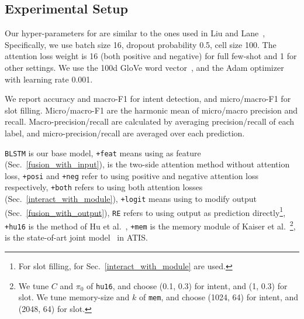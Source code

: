 \subsection{Experimental Setup}
Our hyper-parameters for \BLSTM are similar to the ones used in Liu and Lane~,
Specifically, we use batch size 16, dropout probability 0.5, \BLSTM cell size 100.
The attention loss weight is 16 (both positive and negative) for full few-shot and 1 for other settings.
We use the 100d GloVe word vector~\cite{pennington2014glove}, and the Adam optimizer~\cite{kingma2014adam} with learning rate 0.001.

We report accuracy and macro-F1 for intent detection, and micro/macro-F1 for slot filling.
Micro/macro-F1 are the harmonic mean of micro/macro precision and recall.
Macro-precision/recall are calculated by averaging precision/recall of each label, and micro-precision/recall are averaged over each prediction.

%
\texttt{BLSTM} is our base model,
\texttt{+feat} means using \REtag as feature (Sec.~\ref{fusion_with_input}),
\ptatt is the two-side attention method without attention loss,
\texttt{+posi} and \texttt{+neg} refer to using positive and negative attention loss respectively, \texttt{+both} refers to using both attention losses (Sec.~\ref{interact_with_module}),
\texttt{+logit} means using \REtag to modify \NN output (Sec.~\ref{fusion_with_output}),
\texttt{RE} refers to using \RE output as prediction directly\footnote{
For slot filling, \REs for Sec.~\ref{interact_with_module} are used.},
\texttt{+hu16} is the method of Hu et al.~,
\texttt{+mem} is the memory module of Kaiser et al.~\footnote{
We tune $C$ and $\pi_0$ of \texttt{hu16}, and choose (0.1, 0.3) for intent, and (1, 0.3) for slot. We tune memory-size and $k$ of \texttt{mem}, and choose (1024, 64) for intent, and (2048, 64) for slot.
},
\LL is the state-of-art joint model~\cite{liu2016attention} in ATIS.
